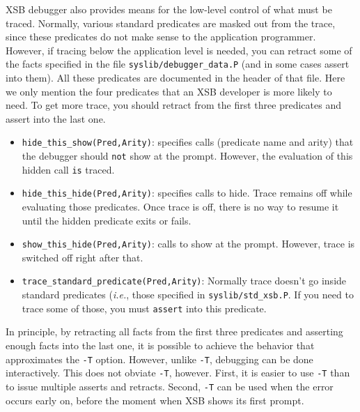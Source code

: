 XSB debugger also provides means for the low-level control of what
must be traced. Normally, various standard predicates are masked out
from the trace, since these predicates do not make sense to the
application programmer.  However, if tracing below the application
level is needed, you can retract some of the facts specified in the
file {\tt syslib/debugger\_data.P} (and in some cases assert into
them). All these predicates are documented in the header of that
file. Here we only mention the four predicates that an XSB developer
is more likely to need. To get more trace, you should retract from the
first three predicates and assert into the last one.
\begin{itemize}
\item {\tt hide\_this\_show(Pred,Arity)}: specifies calls (predicate name and
  arity) that the debugger should {\tt not} show at the prompt. However,
  the evaluation of this hidden call {\tt is} traced.
\item {\tt hide\_this\_hide(Pred,Arity)}: specifies calls to hide. Trace
  remains off while evaluating those predicates. Once trace is off, there
  is no way to resume it until the hidden predicate exits or fails.
\item  {\tt show\_this\_hide(Pred,Arity)}: calls to show at the
  prompt. However, trace is switched off right after that.
\item  {\tt trace\_standard\_predicate(Pred,Arity)}: Normally trace doesn't
  go inside standard predicates ({\it i.e.}, those specified in
  {\tt syslib/std\_xsb.P}. If you need to trace some of those, you must
  {\tt assert} into this predicate.
\end{itemize}
In principle, by retracting all facts from the first three predicates and
asserting enough facts into the last one, it is possible to achieve the
behavior that approximates the {\tt -T} option. However, unlike {\tt -T},
debugging can be done interactively. This does not obviate {\tt -T},
however. First, it is easier to use {\tt -T} than to issue multiple asserts
and retracts. Second, {\tt -T} can be used when the error occurs early on,
before the moment when XSB shows its first prompt.

\newcommand{\mif}{\mbox{ :- }}
\newcommand{\cS}{{\cal S}}
\newcommand{\ctrace}{{\tt logforest}}

